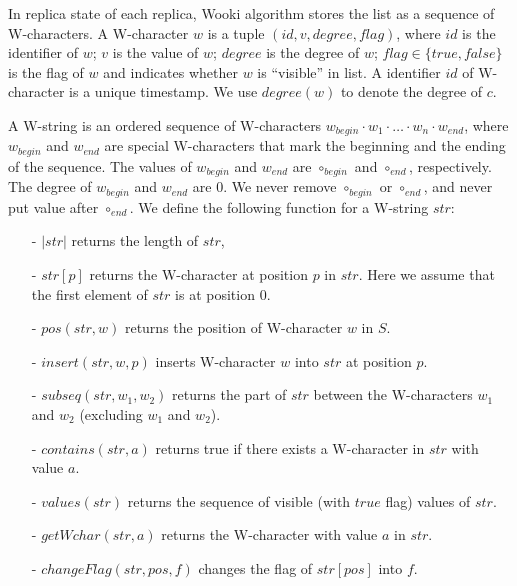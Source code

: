 In replica state of each replica, Wooki algorithm stores the list as a sequence of W-characters. A W-character $w$ is a tuple $(id,v,degree,flag)$, where $id$ is the identifier of $w$; $v$ is the value of $w$; $degree$ is the degree of $w$; $flag \in \{ \mathit{true},\mathit{false} \}$ is the flag of $w$ and indicates whether $w$ is ``visible'' in list. A identifier $id$ of W-character is a unique timestamp. %
We use $degree(w)$ to denote the degree of $c$.

A W-string is an ordered sequence of W-characters $w_{begin} \cdot w_1 \cdot \ldots \cdot w_n \cdot w_{end}$, where $w_{begin}$ and $w_{end}$ are special W-characters that mark the beginning and the ending of the sequence. The values of $w_{begin}$ and $w_{end}$ are $\circ_{begin}$ and $\circ_{end}$, respectively. The degree of $w_{begin}$ and $w_{end}$ are $0$. We never remove $\circ_{begin}$ or $\circ_{end}$, and never put value after $\circ_{end}$. We define the following function for a W-string $str$:

\begin{itemize}
\setlength{\itemsep}{0.5pt}
\item[-] $\vert str \vert$ returns the length of $str$,

\item[-] $str[p]$ returns the W-character at position $p$ in $str$. Here we assume that the first element of $str$ is at position 0.

\item[-] $pos(str,w)$ returns the position of W-character $w$ in $S$.

\item[-] $insert(str,w,p)$ inserts W-character $w$ into $str$ at position $p$.

\item[-] $subseq(str,w_1,w_2)$ returns the part of $str$ between the W-characters $w_1$ and $w_2$ (excluding $w_1$ and $w_2$).

\item[-] $contains(str,a)$ returns true if there exists a W-character in $str$ with value $a$.

\item[-] $values(str)$ returns the sequence of visible (with $\mathit{true}$ flag) values of $str$.

\item[-] $getWchar(str,a)$ returns the W-character with value $a$ in $str$.

\item[-] $changeFlag(str,pos,f)$ changes the flag of $str[pos]$ into $f$.
\end{itemize}

